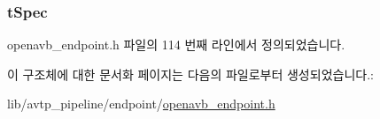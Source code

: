 \subsubsection[{\texorpdfstring{t\+Spec}{tSpec}}]{ t\+Spec}\hypertarget{structopenavb_endpoint_params___listener_callback__t_ab928eca0e7b010a8cc3a80be5bc8adcc}{}\label{structopenavb_endpoint_params___listener_callback__t_ab928eca0e7b010a8cc3a80be5bc8adcc}


openavb\+\_\+endpoint.\+h 파일의 114 번째 라인에서 정의되었습니다.



이 구조체에 대한 문서화 페이지는 다음의 파일로부터 생성되었습니다.\+:\begin{DoxyCompactItemize}
\item 
lib/avtp\+\_\+pipeline/endpoint/\hyperlink{openavb__endpoint_8h}{openavb\+\_\+endpoint.\+h}\end{DoxyCompactItemize}
